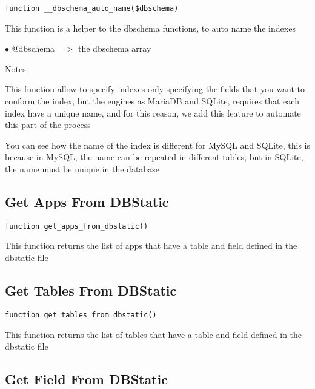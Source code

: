 \documentclass[a4paper]{book}
\begin{document}
\begin{lstlisting}
function __dbschema_auto_name($dbschema)
\end{lstlisting}

This function is a helper to the dbschema functions, to auto name the indexes

\begin{compactitem}
\item[\color{myblue}$\bullet$] @dbschema =$>$ the dbschema array
\end{compactitem}

Notes:

This function allow to specify indexes only specifying the fields that you want
to conform the index, but the engines as MariaDB and SQLite, requires that each
index have a unique name, and for this reason, we add this feature to automate
this part of the process

You can see how the name of the index is different for MySQL and SQLite, this is
because in MySQL, the name can be repeated in different tables, but in SQLite,
the name must be unique in the database

\hypertarget{toc95}{}
\subsection{Get Apps From DBStatic}

\begin{lstlisting}
function get_apps_from_dbstatic()
\end{lstlisting}

This function returns the list of apps that have a table and field defined
in the dbstatic file

\hypertarget{toc96}{}
\subsection{Get Tables From DBStatic}

\begin{lstlisting}
function get_tables_from_dbstatic()
\end{lstlisting}

This function returns the list of tables that have a table and field defined
in the dbstatic file

\hypertarget{toc97}{}
\subsection{Get Field From DBStatic}
\end{document}
